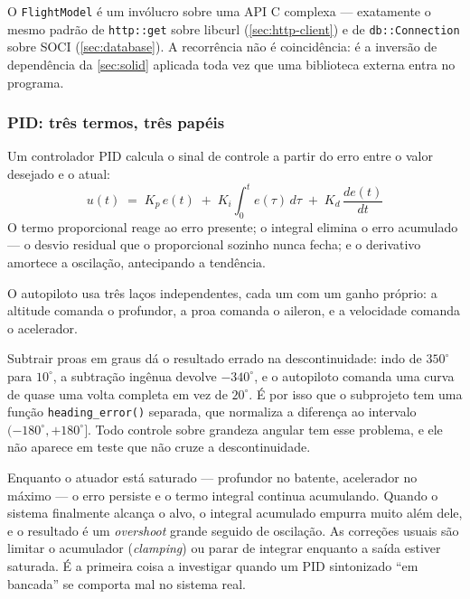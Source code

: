 O \texttt{FlightModel} é um invólucro sobre uma API C complexa --- exatamente o
mesmo padrão de \texttt{http::get} sobre libcurl (\cref{sec:http-client}) e de
\texttt{db::Connection} sobre SOCI (\cref{sec:database}). A recorrência não é
coincidência: é a inversão de dependência da \cref{sec:solid} aplicada toda vez
que uma biblioteca externa entra no programa.

\subsubsection{PID: três termos, três papéis}

Um controlador PID calcula o sinal de controle a partir do erro entre o valor
desejado e o atual:
\[
u(t) \;=\; K_p\,e(t) \;+\; K_i \int_0^t e(\tau)\,d\tau \;+\; K_d\,\frac{de(t)}{dt}
\]
O termo proporcional reage ao erro presente; o integral elimina o erro
acumulado --- o desvio residual que o proporcional sozinho nunca fecha; e o
derivativo amortece a oscilação, antecipando a tendência.

O autopiloto usa três laços independentes, cada um com um ganho próprio: a
altitude comanda o profundor, a proa comanda o aileron, e a velocidade comanda o
acelerador.

\begin{armadilha}
Subtrair proas em graus dá o resultado errado na descontinuidade: indo de
$350^\circ$ para $10^\circ$, a subtração ingênua devolve $-340^\circ$, e o
autopiloto comanda uma curva de quase uma volta completa em vez de
$20^\circ$. É por isso que o subprojeto tem uma função
\texttt{heading\_error()} separada, que normaliza a diferença ao intervalo
$(-180^\circ, +180^\circ]$. Todo controle sobre grandeza angular tem esse
problema, e ele não aparece em teste que não cruze a descontinuidade.
\end{armadilha}

\begin{armadilha}
Enquanto o atuador está saturado --- profundor no batente, acelerador no máximo
--- o erro persiste e o termo integral continua acumulando. Quando o sistema
finalmente alcança o alvo, o integral acumulado empurra muito além dele, e o
resultado é um \emph{overshoot} grande seguido de oscilação. As correções
usuais são limitar o acumulador (\emph{clamping}) ou parar de integrar enquanto
a saída estiver saturada. É a primeira coisa a investigar quando um PID
sintonizado ``em bancada'' se comporta mal no sistema real.
\end{armadilha}

